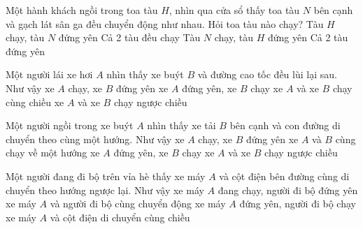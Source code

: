 \begin{ex}
Một hành khách ngồi trong toa tàu $H$, nhìn qua cửa sổ thấy toa tàu $N$ bên cạnh và gạch lát sân ga đều chuyển động như nhau. Hỏi toa tàu nào chạy?
\choice
{\True Tàu $H$ chạy, tàu $N$ đứng yên}
{Cả 2 tàu đều chạy}
{Tàu $N$ chạy, tàu $H$ đứng yên}
{Cả 2 tàu đứng yên}
\end{ex}

\begin{ex}
Một người lái xe hơi $A$ nhìn thấy xe buýt $B$ và đường cao tốc đều lùi lại sau. Như vậy
\choice
{\True xe $A$ chạy, xe $B$ đứng yên}
{xe $A$ đứng yên, xe $B$ chạy}
{xe $A$ và xe $B$ chạy cùng chiều}
{xe $A$ và xe $B$ chạy ngược chiều}
\end{ex}

\begin{ex}
Một người ngồi trong xe buýt $A$ nhìn thấy xe tải $B$ bên cạnh và con đường di chuyển theo cùng một hướng. Như vậy
\choice
{\True xe $A$ chạy, xe $B$ đứng yên}
{xe $A$ và $B$ cùng chạy về một hướng}
{xe $A$ đứng yên, xe $B$ chạy}
{xe $A$ và xe $B$ chạy ngược chiều}
\end{ex}

\begin{ex}
Một người đang đi bộ trên vỉa hè thấy xe máy $A$ và cột điện bên đường cùng di chuyển theo hướng ngược lại. Như vậy
\choice
{\True xe máy $A$ đang chạy, người đi bộ đứng yên}
{xe máy $A$ và người đi bộ cùng chuyển động}
{xe máy $A$ đứng yên, người đi bộ chạy}
{xe máy $A$ và cột điện di chuyển cùng chiều}
\end{ex}

